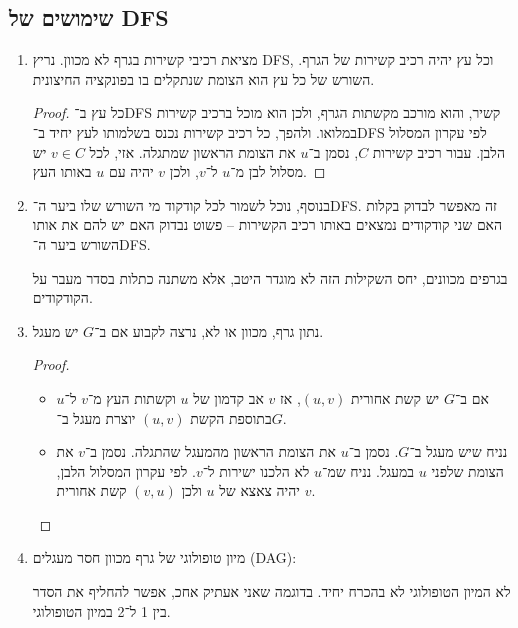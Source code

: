 \documentclass[]{../../../../tex/classes/styledArticle}
\begin{document}
	\subsection*{שימושים של DFS}
	\begin{enumerate}
		\item מציאת רכיבי קשירות בגרף לא מכוון. נריץ DFS, וכל עץ יהיה רכיב קשירות של הגרף. השורש של כל עץ הוא הצומת שנתקלים בו בפונקציה החיצונית. \begin{proof}
			כל עץ ב־DFS קשיר, והוא מורכב מקשתות הגרף, ולכן הוא מוכל ברכיב קשירות במלואו. ולהפך, כל רכיב קשירות נכנס בשלמותו לעץ יחיד ב־DFS לפי עקרון המסלול הלבן. עבור רכיב קשירות $C$, נסמן ב־$u$ את הצומת הראשון שמתגלה. אזי, לכל $v \in C$ יש מסלול לבן מ־$u$ ל־$v$, ולכן $v$ יהיה עם $u$ באותו העץ. 
		\end{proof}
		\item בנוסף, נוכל לשמור לכל קודקוד מי השורש שלו ביער ה־DFS. זה מאפשר לבדוק בקלות האם שני קודקודים נמצאים באותו רכיב הקשירות – פשוט נבדוק האם יש להם את אותו השורש ביער ה־DFS. 
		
		בגרפים מכוונים, יחס השקילות הזה לא מוגדר היטב, אלא משתנה כתלות בסדר מעבר על הקודקודים. 
		\item נתון גרף, מכוון או לא, נרצה לקבוע אם ב־$G$ יש מעגל. 
		
		\begin{proof}
			\begin{itemize}
				\item[$\implies$] אם ב־$G$ יש קשת אחורית $(u, v)$, אז $v$ אב קדמון של $u$ וקשתות העץ מ־$v$ ל־$u$ בתוספת הקשת $(u, v)$ יוצרת מעגל ב־$G$. 
				\item[$\impliedby$]נניח שיש מעגל ב־$G$. נסמן ב־$u$ את הצומת הראשון מהמעגל שהתגלה. נסמן ב־$v$ את הצומת שלפני $u$ במעגל. נניח שמ־$u$ לא הלכנו ישירות ל־$v$. לפי עקרון המסלול הלבן, $v$ יהיה צאצא של $u$ ולכן $(v, u)$ קשת אחורית. 
			\end{itemize}\envendproof
		\end{proof}
		\item מיון טופולוגי של גרף מכוון חסר מעגלים (DAG):
		
		לא המיון הטופולוגי לא בהכרח יחיד. בדוגמה שאני אעתיק אחכ, אפשר להחליף את הסדר בין 1 ל־2 במיון הטופולוגי. 
		

\end{enumerate}
\end{document}
